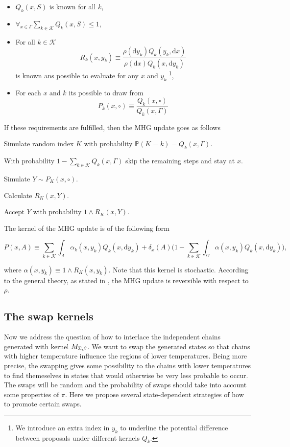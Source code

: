 \begin{itemize}
	\item $Q_k (x,S)$ is known for all $k$,
	\item $\forall_{x \in \Gamma} \underset{ k \in \mathcal{K}}{\sum} Q_k (x,S) \leq 1$,
	\item For all $k \in \mathcal{K}$ $$R_k (x,y_k) \equiv \frac{\rho(\mathrm{d } y_k)Q_k (y_k, \mathrm{d }x)}{\rho(\mathrm{d } x)Q_k (x, \mathrm{d }y_k)}$$ is known ans possible to evaluate for any $x$ and $y_k$ \footnote{We introduce an extra index in $y_k$ to underline the potential difference between proposals under different kernels $Q_k$.},
	\item For each $x$ and $k$ its possible to draw from $$P_k(x, \circ) \equiv \frac{Q_k (x, \circ)}{Q_k (x, \Gamma)}$$
\end{itemize}

If these requirements are fulfilled, then the MHG update goes as follows

\begin{algorithm}
\item Simulate random index $K$ with probability $\mathbb{P}( K = k ) = Q_k (x,\Gamma)$.
\item[] With probability $1-\underset{k \in \mathcal{K}}{\sum} Q_k (x,\Gamma)$ skip the remaining steps and stay at $x$.
\item Simulate $Y \sim P_K (x, \circ)$.
\item Calculate $R_K (x,Y)$.
\item Accept $Y$ with probability $1\wedge R_K (x,Y)$.
\end{algorithm}

The kernel of the MHG update is of the following form

	$$P(x,A) \equiv \underset{k \in \mathcal{K}}{\sum} \int_A \alpha_k (x,y_k) Q_k(x, \mathrm{d }y_k) + \delta_x (A) \Big(1 - \underset{k \in \mathcal{K}}{\sum} \int_{\Omega} \alpha(x,y_k) Q_k(x,\mathrm{d }y_k) \Big), $$

where $\alpha(x,y_k) \equiv 1\wedge R_K (x,y_k)$. Note that this kernel is stochastic. According to the general theory, as stated in \cite{CharlesJ.Geyer}, the MHG update is reversible with respect to $\rho$. 



	\subsection*{The swap kernels}

Now we address the question of how to interlace the independent chains generated with kernel $M_{\Sigma,\beta}$. We want to swap the generated states so that chains with higher temperature influence the regions of lower temperatures. Being more precise, the swapping gives some possibility to the chains with lower temperatures to find themeselves in states that would otherwise be very less probable to occur. The swaps will be random and the probability of swaps should take into account some properties of $\pi$. Here we propose several state-dependent strategies of how to promote certain swaps.

